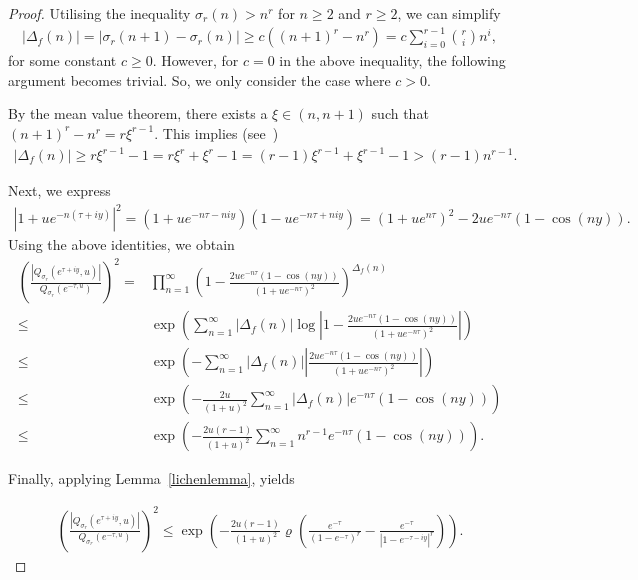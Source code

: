 \documentclass[12pt, oneside,reqno]{amsart}
\numberwithin{equation}{section}
\begin{document}
\begin{proof}
Utilising the inequality $\sigma_r(n)>n^r$ for $n\geq 2$ and $r\geq 2$, we can simplify
\begin{align*}
|\Delta_f(n)|
=|\sigma_r(n+1)-\sigma_r(n)|
\geq c((n+1)^{r}-n^{r})
=c\sum_{i=0}^{r-1}\binom{r}{i}n^{i},
\end{align*}
for some constant $c\geq 0$. However, for $c=0$ in the above inequality, the following argument becomes trivial. So, we only consider the case where $c>0$.

By the mean value theorem, there exists a $\xi\in (n,n+1)$ such that $(n+1)^{r}-n^{r}=r\xi^{r-1}$. This implies (see~\cite[Lemma 2.6]{lichen})
\begin{align}\label{lowerboundforgn}
|\Delta_f(n)|
\geq r\xi^{r-1}-1
=r\xi^{r}+\xi^{r}-1
=(r-1)\xi^{r-1}+\xi^{r-1}-1
>(r-1)n^{r-1}.
\end{align}

\noindent
Next, we express
\begin{align*}
\left|1+ue^{-n(\tau+iy)}\right|^2
=(1+ue^{-n\tau-niy})(1-ue^{-n\tau+niy})
=(1+ue^{n\tau})^2-2ue^{-n\tau}(1-\cos(ny)).
\end{align*}
\noindent
Using the above identities, we obtain
\begin{align*}
\left(\frac{|Q_{\sigma_r}(e^{\tau+iy},u)|}{Q_{\sigma_r}(e^{-\tau,u})}\right)^2
=&\prod_{n=1}^{\infty}\left(1-\frac{2ue^{-n\tau}(1-\cos(ny))}{(1+ue^{-n\tau})^2}\right)^{\Delta_f(n)}\\
\leq &\exp\left(\sum_{n=1}^{\infty}|\Delta_f(n)|\log\left|1-\frac{2ue^{-n\tau}(1-\cos(ny))}{(1+ue^{-n\tau})^2}\right|\right)\\
\leq&\exp\left(-\sum_{n=1}^{\infty}|\Delta_f(n)|\left|\frac{2ue^{-n\tau}(1-\cos(ny))}{(1+ue^{-n\tau})^2}\right|\right)\\
\leq&\exp\left(-\frac{2u}{(1+u)^2}\sum_{n=1}^{\infty}|\Delta_f(n)|e^{-n\tau}(1-\cos(ny))\right)\\
\leq&\exp\left(-\frac{2u(r-1)}{(1+u)^2}\sum_{n=1}^{\infty}n^{r-1}e^{-n\tau}(1-\cos(ny))\right).
\end{align*}

\noindent
Finally, applying Lemma~\ref{lichenlemma}, yields

\begin{align}\label{mainexpression}
\left(\frac{|Q_{\sigma_r}(e^{\tau+iy},u)|}{Q_{\sigma_r}(e^{-\tau,u})}\right)^2
\leq\exp\left(-\frac{2u(r-1)}{(1+u)^2}\varrho\left(\frac{e^{-\tau}}{(1-e^{-\tau})^{r}}-\frac{e^{-\tau}}{\left|1-e^{-\tau-iy}\right|^{r}}\right)\right).
\end{align}


\end{proof}
\end{document}
